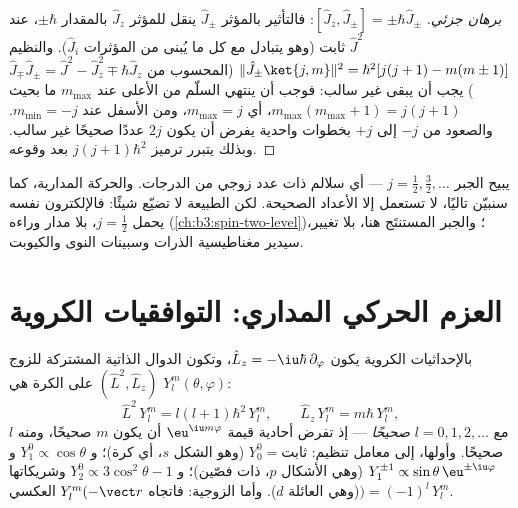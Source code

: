 \begin{proof}[برهان جزئي]
$[\hat J_z, \hat J_\pm] = \pm\hbar\hat J_\pm$: فالتأثير بالمؤثر $\hat
J_\pm$ ينقل  للمؤثر $\hat J_z$ بالمقدار $\pm\hbar$، عند
$\hat J^2$ ثابت (وهو يتبادل مع كل ما يُبنى من المؤثرات $\hat
J_i$). والنظيم $\|\hat J_\pm\ket{j,m}\|^2 = \hbar^2[j(j+1) -
m(m\pm1)]$ (المحسوب من $\hat J_\mp\hat J_\pm = \hat J^2 - \hat
J_z^2 \mp \hbar\hat J_z$) يجب أن يبقى غير سالب: فوجب أن ينتهي
السلّم من الأعلى عند $m_{\max}$ ما بحيث $m_{\max}(m_{\max}+1) =
j(j+1)$، أي $m_{\max} = j$، ومن الأسفل عند $m_{\min} = -j$.
والصعود من $-j$ إلى $+j$ بخطوات واحدية يفرض أن يكون $2j$ عددًا
صحيحًا غير سالب. وبذلك يتبرر ترميز  $j(j+1)\hbar^2$
بعد وقوعه.
\end{proof}

\begin{remark}\label{rem:b3:quantum-angular-momentum:halfinteger}
يبيح الجبر $j = \tfrac12, \tfrac32, \dots$ --- أي سلالم ذات
عدد زوجي من الدرجات. والحركة المدارية، كما سنبيّن تاليًا، لا
تستعمل إلا الأعداد الصحيحة. لكن الطبيعة لا تضيّع شيئًا: فالإلكترون
نفسه يحمل $j = \tfrac12$، بلا مدار وراءه
(\cref{ch:b3:spin-two-level})؛ والجبر المستنتَج هنا، بلا تغيير،
سيدير مغناطيسية الذرات وسبينات النوى والكيوبت.
\end{remark}

\section{العزم الحركي المداري: التوافقيات الكروية}

\begin{proposition}\label{prop:b3:quantum-angular-momentum:harmonics}
بالإحداثيات الكروية يكون $\hat L_z = -\iu\hbar\,\partial_\varphi$،
وتكون الدوال الذاتية المشتركة للزوج $(\hat L^2, \hat L_z)$ على الكرة
هي \emph{} $Y_l^m(\theta, \varphi)$:
\[
\hat L^2\,Y_l^m = l(l+1)\hbar^2\,Y_l^m , \qquad
\hat L_z\,Y_l^m = m\hbar\,Y_l^m ,
\]
مع $l = 0, 1, 2, \dots$ \emph{صحيحًا} --- إذ تفرض أحادية قيمة
$\eu^{\iu m\varphi}$ أن يكون $m$ صحيحًا، ومنه $l$ صحيحًا. وأولها،
إلى معامل تنظيم: $Y_0^0 = \text{ثابت}$ (وهو الشكل $s$،
أي كرة)؛ و $Y_1^0 \propto \cos\theta$ و $Y_1^{\pm1}
\propto \sin\theta\,\eu^{\pm\iu\varphi}$ (وهي الأشكال $p$، ذات فصّين)؛
و $Y_2^0 \propto 3\cos^2\theta - 1$ وشريكاتها (وهي العائلة $d$).
وأما الزوجية: فاتجاه $Y_l^m(-\vect r$ العكسي$) = (-1)^l\,Y_l^m$.
\end{proposition}
\admitted


